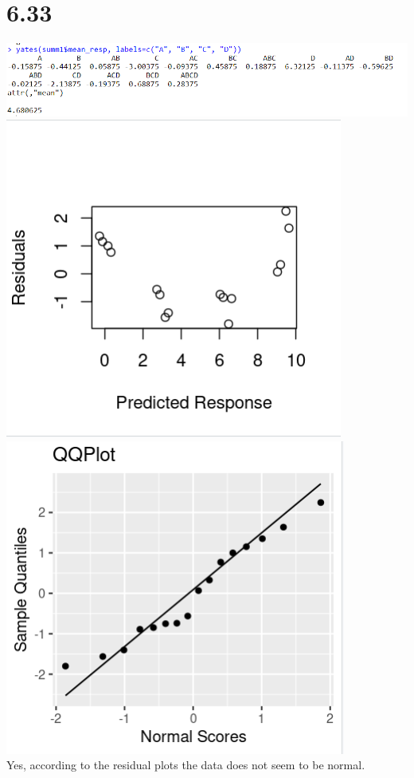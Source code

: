 \documentclass{article}
\begin{document}
\section*{6.33}
\includegraphics{6.33a.PNG}
\\\includegraphics{6.33bRes.PNG} \includegraphics{6.33bQQ.PNG}
\\Yes, according to the residual plots the data does not seem to be normal.
\end{document}
